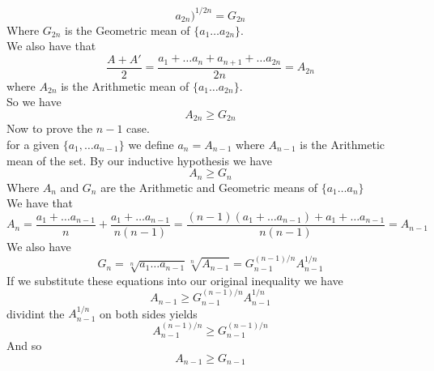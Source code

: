 \documentclass[12pt]{article}
\newenvironment{ques}{\vspace{2 ex}}{\vspace{2 ex}}
\theoremstyle{definition}
\begin{document}
\begin{ques}
\begin{enumerate}
$$				a_{2n})^{1/2n} = G_{2n}$$
				Where $G_{2n}$ is the Geometric mean of $\{a_1
				\dots a_{2n}\}$.\\
				We also have that
				$$\frac{A + A'}{2} = \frac{a_1 + \dots a_n +
				a_{n+1} + \dots a_{2n}}{2n} = A_{2n}$$
				where $A_{2n}$ is the Arithmetic mean of $\{a_1
				\dots a_{2n}\}$.\\
				So we have
				$$A_{2n} \geq G_{2n}$$
				Now to prove the $n-1$ case.\\
				for a given $\{a_1, \dots a_{n-1}\}$ we define
				$a_n = A_{n-1}$ where $A_{n-1}$ is the
				Arithmetic mean of the set. By our inductive
				hypothesis we have
				$$A_n \geq G_n$$
				Where $A_n$ and $G_n$ are the Arithmetic and
				Geometric means of $\{a_1 \dots a_n\}$\\
				We have that
				$$A_n = \frac{a_1 + \dots a_{n-1}}{n} +
				\frac{a_1 + \dots a_{n-1}}{n(n-1)} =
				\frac{(n-1)(a_1 + \dots a_{n-1}) + a_1 + \dots
				a_{n-1}}{n(n-1)} = A_{n-1}$$
				We also have
				$$G_n = \sqrt[n]{a_1 \dots
				a_{n-1}}\sqrt[n]{A_{n-1}} =
				G_{n-1}^{(n-1)/n}A_{n-1}^{1/n}$$
				If we substitute these equations into our
				original inequality we have
				$$A_{n-1} \geq G_{n-1}^{(n-1)/n}A_{n-1}^{1/n}$$
				dividint the $A_{n-1}^{1/n}$ on both sides yields
				$$A_{n-1}^{(n-1)/n} \geq G_{n-1}^{(n-1)/n}$$
				And so 
				$$A_{n-1} \geq G_{n-1}$$




		\end{enumerate}
\end{ques}
\end{document}
